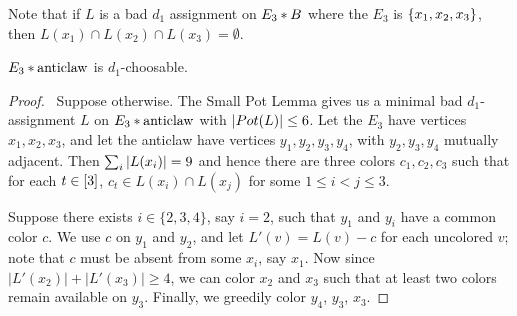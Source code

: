Note that if $L$ is a bad $d_1$ assignment on $E_3 \mbox{\hspace{2 pt}$\ast$\hspace{2 pt}} B$ where the $E_3$ is $\left\{ x_1, x_2, x_3 \right\}$, then $L(x_1) \cap L(x_2) \cap L(x_3) = \emptyset$.
\begin{lem}\label{E3JoinAntiClaw}
$E_3 \mbox{\hspace{2 pt}$\ast$\hspace{2 pt}} \text{anticlaw}$ is $d_1$-choosable.
\end{lem}
\begin{proof}\
Suppose otherwise. The Small Pot Lemma gives us a minimal bad $d_1$-assignment
$L$ on $E_3 \mbox{\hspace{2 pt}$\ast$\hspace{2 pt}} \text{anticlaw}$ with $\left|Pot(L)\right| \leq 6$.  Let the $E_3$
have vertices $x_1, x_2, x_3$, and let the anticlaw have vertices $y_1,
y_2, y_3, y_4$, with $y_2, y_3, y_4$ mutually adjacent.  Then $\sum_i \left|L(x_i)\right| = 9$ and hence there are three colors $c_1, c_2, c_3$ such that for each $t \in \left[3\right]$, $c_t \in L(x_i) \cap L(x_j)$ for some $1 \leq i < j \leq 3$.  

Suppose there exists $i\in\{2,3,4\}$, say $i=2$, such that $y_1$ and $y_i$ have
a common color $c$.  We use $c$ on $y_1$ and $y_2$, and let $L'(v)=L(v)-c$ for
each uncolored $v$; note that $c$ must be absent from some $x_i$, say $x_1$. 
Now since $|L'(x_2)|+|L'(x_3)|\ge 4$, we can color $x_2$ and $x_3$
such that at least two colors remain available on $y_3$.  Finally, we greedily
color $y_4$, $y_3$, $x_3$.


\end{proof}
